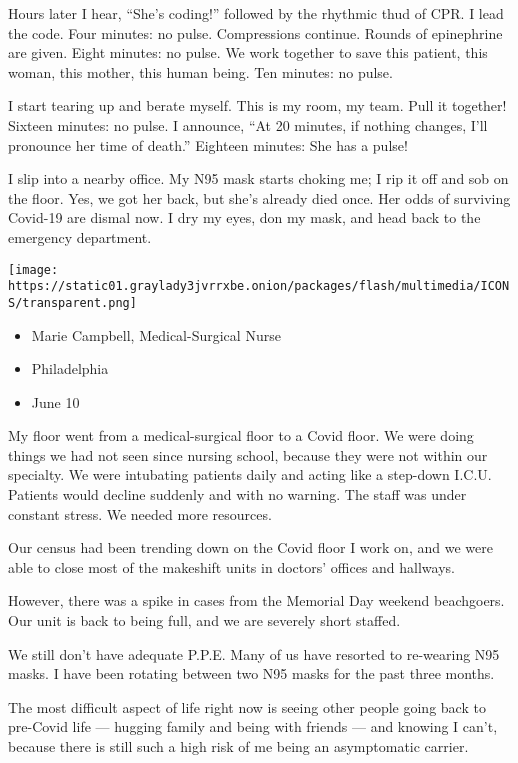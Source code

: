 Hours later I hear, ``She's coding!'' followed by the rhythmic thud of
CPR. I lead the code. Four minutes: no pulse. Compressions continue.
Rounds of epinephrine are given. Eight minutes: no pulse. We work
together to save this patient, this woman, this mother, this human
being. Ten minutes: no pulse.

I start tearing up and berate myself. This is my room, my team. Pull it
together! Sixteen minutes: no pulse. I announce, ``At 20 minutes, if
nothing changes, I'll pronounce her time of death.'' Eighteen minutes:
She has a pulse!

I slip into a nearby office. My N95 mask starts choking me; I rip it off
and sob on the floor. Yes, we got her back, but she's already died once.
Her odds of surviving Covid-19 are dismal now. I dry my eyes, don my
mask, and head back to the emergency department.

\texttt{[image: https://static01.graylady3jvrrxbe.onion/packages/flash/multimedia/ICONS/transparent.png]}

\begin{itemize}
\tightlist
\item
  Marie Campbell, Medical-Surgical Nurse
\item
  Philadelphia
\item
  June 10
\end{itemize}

My floor went from a medical-surgical floor to a Covid floor. We were
doing things we had not seen since nursing school, because they were not
within our specialty. We were intubating patients daily and acting like
a step-down I.C.U. Patients would decline suddenly and with no warning.
The staff was under constant stress. We needed more resources.

Our census had been trending down on the Covid floor I work on, and we
were able to close most of the makeshift units in doctors' offices and
hallways.

However, there was a spike in cases from the Memorial Day weekend
beachgoers. Our unit is back to being full, and we are severely short
staffed.

We still don't have adequate P.P.E. Many of us have resorted to
re-wearing N95 masks. I have been rotating between two N95 masks for the
past three months.

The most difficult aspect of life right now is seeing other people going
back to pre-Covid life --- hugging family and being with friends --- and
knowing I can't, because there is still such a high risk of me being an
asymptomatic carrier.

